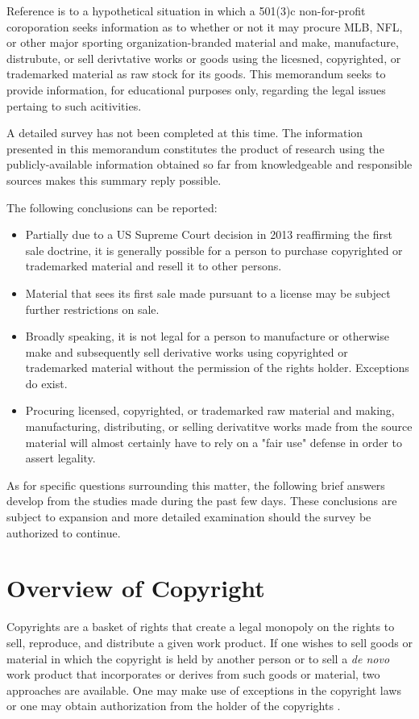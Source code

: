 \documentclass[letterpaper,11pt]{texMemo}
\begin{document}
\maketitle

Reference is to a hypothetical situation in which a 501(3)c non-for-profit coroporation seeks information as to whether or not it may procure MLB, NFL, or other major sporting organization-branded material and make, manufacture, distrubute, or sell derivtative works or goods using the licesned, copyrighted, or trademarked material as raw stock for its goods. This memorandum seeks to provide information, for educational purposes only, regarding the legal issues pertaing to such acitivities.

A detailed survey has not been completed at this time.  The information presented in this memorandum constitutes the product of research using the publicly-available information obtained so far from knowledgeable and responsible sources makes this summary reply possible.

The following conclusions can be reported:

\begin{itemize}
 \item Partially due to a US Supreme Court decision in 2013 reaffirming the first sale doctrine, it is generally possible for a person to purchase copyrighted or trademarked material and resell it to other persons.
 \item Material that sees its first sale made pursuant to a license may be subject further restrictions on sale.
 \item Broadly speaking, it is not legal for a person to manufacture or otherwise make and subsequently sell derivative works using copyrighted or trademarked material without the permission of the rights holder. Exceptions do exist.
 \item Procuring licensed, copyrighted, or trademarked raw material and making, manufacturing, distributing, or selling derivatitve works made from the source material will almost certainly have to rely on a "fair use" defense in order to assert legality.
\end{itemize}

As for specific questions surrounding this matter, the following brief answers develop from the studies made during the past few days. These conclusions are subject to expansion and more detailed examination should the survey be authorized to continue.

\section*{Overview of Copyright}
Copyrights are a basket of rights that create a legal monopoly on the rights to sell, reproduce, and distribute a given work product. If one wishes to sell goods or material in which the copyright is held by another person or to sell a \emph{de novo} work product that incorporates or derives from such goods or material, two approaches are available. One may make use of exceptions in the copyright laws or one may obtain authorization from the holder of the copyrights \cite{carnes}.
\end{document}
